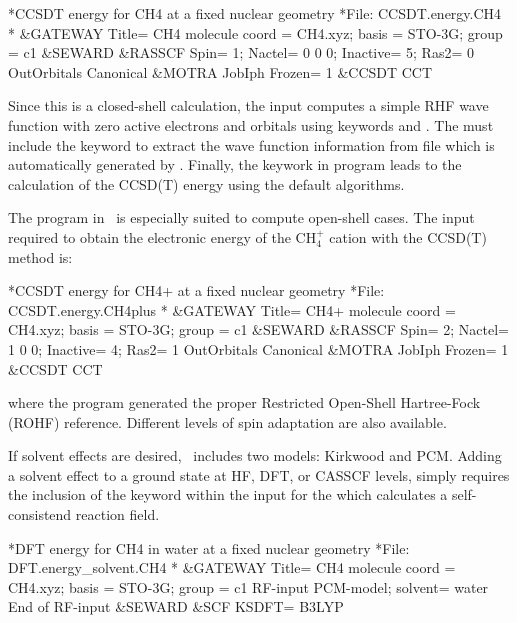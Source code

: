 \begin{inputlisting}
*CCSDT energy for CH4 at a fixed nuclear geometry
*File: CCSDT.energy.CH4
*
&GATEWAY
 Title= CH4 molecule
 coord = CH4.xyz; basis = STO-3G; group = c1
&SEWARD
&RASSCF
 Spin= 1; Nactel= 0 0 0; Inactive= 5; Ras2= 0
 OutOrbitals
 Canonical
&MOTRA
 JobIph
 Frozen= 1
&CCSDT
 CCT
\end{inputlisting}

Since this is a closed-shell calculation, the  input 
computes a simple RHF wave function with zero active electrons and orbitals using 
keywords  and . The  must
include the keyword  to extract the wave function information
from file  which is automatically generated by . Finally,
the keywork  in program  leads to the calculation of the
CCSD(T) energy using the default algorithms.

The  program in \molcas\ is especially suited to compute open-shell
cases. The input required to obtain the electronic energy of the CH$_4^+$ cation
with the CCSD(T) method is:


\begin{inputlisting}
*CCSDT energy for CH4+ at a fixed nuclear geometry
*File: CCSDT.energy.CH4plus
*
&GATEWAY
 Title= CH4+ molecule
 coord = CH4.xyz; basis = STO-3G; group = c1
&SEWARD
&RASSCF
 Spin= 2; Nactel= 1 0 0; Inactive= 4; Ras2= 1
 OutOrbitals
 Canonical
&MOTRA
 JobIph
 Frozen= 1
&CCSDT
 CCT
\end{inputlisting}

where the  program generated the proper Restricted Open-Shell 
Hartree-Fock (ROHF) reference. Different levels of spin adaptation are also available.

If solvent effects are desired, \molcas\ includes two
models: Kirkwood and PCM. Adding a solvent effect to a ground state at HF, DFT, or CASSCF levels,
simply requires the inclusion of the keyword  within the input for the  
which calculates a self-consistend reaction field.

\begin{inputlisting}
*DFT energy for CH4 in water at a fixed nuclear geometry
*File: DFT.energy_solvent.CH4
*
&GATEWAY
 Title= CH4 molecule
 coord = CH4.xyz; basis = STO-3G; group = c1
 RF-input
   PCM-model; solvent= water
 End of RF-input
&SEWARD
&SCF
KSDFT= B3LYP
\end{inputlisting}

